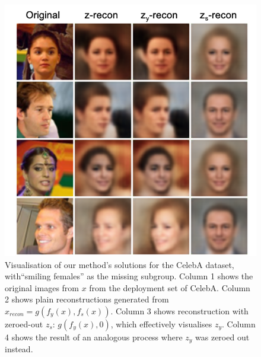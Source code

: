 \begin{figure}[ht]
    \centering
    \includegraphics[width=\columnwidth]{paper3/figures/celeba_dep_recon.png}
    \caption{%
    Visualisation of our method's solutions for the CelebA dataset, with``smiling females'' as the missing subgroup.
    Column 1 shows the original images from $x$ from the deployment set of CelebA.
    Column 2 shows plain reconstructions generated from $x_\textit{recon}=g(f_y(x), f_s(x))$.
    Column 3 shows reconstruction with zeroed-out $z_s$: $g(f_y(x), 0)$, which effectively visualises $z_y$.
    Column 4 shows the result of an analogous process where $z_y$ was zeroed out instead.
    }%
    \label{fig:celeba-recons}
\end{figure}

